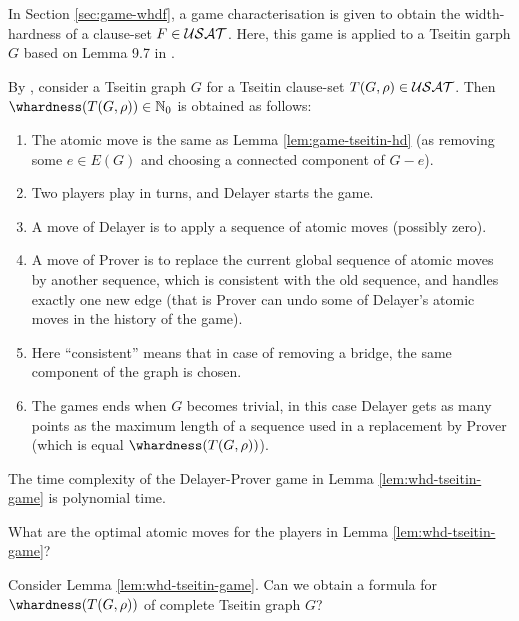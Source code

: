 \documentclass{report}
\begin{document}
In Section  \ref{sec:game-whdf}, a game characterisation is given to obtain the width-hardness of a clause-set $F \in \mathcal{USAT}$. Here, this game is applied to a Tseitin garph $G$ based on Lemma 9.7 in \cite{BeyersdorffGwynneKullmann2013PHPER}.

\begin{lem}\label{lem:whd-tseitin-game}
By \cite{BeyersdorffGwynneKullmann2013PHPER}, consider  a Tseitin graph $G$ for a Tseitin clause-set $T(G,\rho) \in \mathcal{USAT}$. Then $\whardness(T(G,\rho)) \in \NNZ$ is obtained as follows:
  \begin{enumerate}
  \item The atomic move is the same as Lemma \ref{lem:game-tseitin-hd} (as removing some $e \in E(G)$ and choosing a connected component of $G - e$).
  \item Two players play in turns, and Delayer starts the game.
  \item A move of Delayer is to apply a sequence of atomic moves (possibly zero).
  \item A move of Prover is to replace the current global sequence of atomic moves by another sequence, which is consistent with the old sequence, and handles exactly one new edge (that is Prover can undo some of Delayer's atomic moves in the history of the game).
  \item Here ``consistent'' means that in case of removing a bridge, the same component of the graph is chosen.
  \item The games ends when $G$ becomes trivial, in this case Delayer gets as many points as the maximum length of a sequence used in a replacement by Prover (which is equal $\whardness(T(G,\rho))$).
  \end{enumerate}
\end{lem}

\begin{conj}\label{con:whd-gametime}
The time complexity of the Delayer-Prover game in Lemma \ref{lem:whd-tseitin-game} is polynomial time.
\end{conj}

\begin{quest}\label{que:game-whd-atm}
What are the optimal atomic moves for the players in Lemma \ref{lem:whd-tseitin-game}?
\end{quest}

\begin{quest}\label{que:game-whd-Kn}
Consider Lemma \ref{lem:whd-tseitin-game}. Can we obtain a formula for $\whardness(T(G,\rho))$ of complete Tseitin graph $G$?
\end{quest}
\end{document}
